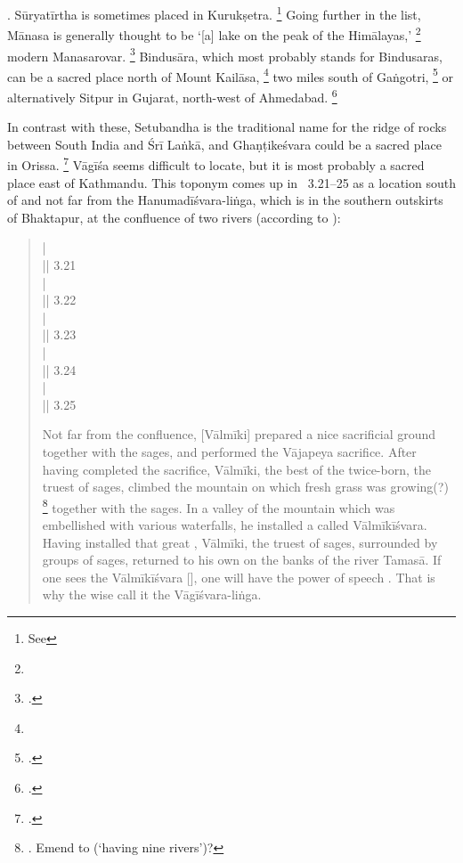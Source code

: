 .
Sūryatīrtha is sometimes placed in Kurukṣetra.%
		\footnote{See 
		}
Going further in the list, Mānasa is generally thought
to be `[a] lake on the peak of the Himālayas,'%
	\footnote{}
modern Mana\-sarovar.%
	\footnote{.} 
Bindusāra, which most probably stands for
Bindusaras, can be a sacred place north of Mount
Kailāsa,%
	\footnote{}
two miles south of Gaṅgotri,%
	\footnote{.}
or alternatively Sitpur in Gujarat, north-west of 
Ahmedabad.%
	\footnote{.}
	
In contrast with these, Setubandha is the
traditional name for the ridge of rocks between
South India and Śrī Laṅkā, and Ghaṇṭikeśvara could
be a sacred place in Orissa.%
	\footnote{.}
Vāgīśa seems difficult to locate, but it is most probably
a sacred place east of Kathmandu. This toponym comes
up in \NepMah\ 3.21--25 as a location south of and 
not far from the Hanumadīśvara-liṅga,
which is in the southern outskirts of 
Bhaktapur, at the confluence of two rivers (according to 
):

\begin{quote}
 |\\
 || 3.21\\
 |\\
 || 3.22\\
 |\\
 || 3.23\\
 |\\
 || 3.24\\
 |\\
 || 3.25

Not far from the confluence, [Vālmīki] prepared a nice
sacrificial ground together with the sages, and 
performed the Vājapeya sacrifice. After having
completed the sacrifice, Vālmīki, the best of
the twice-born, the truest of sages, climbed 
the mountain on which fresh grass was growing(?)%
	\footnote{. Emend to 
	 (`having nine rivers')?}
together with the sages. In a valley of the mountain
which was embellished with various waterfalls, he
installed a  called Vālmīkīśvara. Having 
installed that great , Vālmīki, the truest of
sages, surrounded by groups of sages,
returned to his own  on the banks
of the river Tamasā. If one sees the Vālmīkīśvara [],
one will have the power of speech . 
That is why the wise call it the Vāgīśvara-liṅga.
\end{quote}

